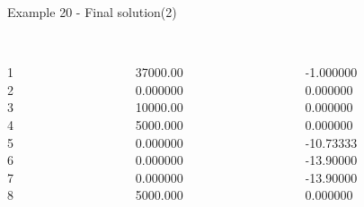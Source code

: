 \begin{frame}{Example 20 - Final solution(2)}
\footnotesize

\begin{columns}[t]
\begin{column}{0.3\textwidth}
\\
1\\
2\\
3\\
4\\
5\\
6\\
7\\
8\\
\end{column}

\begin{column}{0.3\textwidth}
\\
37000.00\\
0.000000\\
10000.00\\
5000.000\\
0.000000\\
0.000000\\
0.000000\\
5000.000\\
\end{column}  

\begin{column}{0.3\textwidth}
\\
-1.000000\\
0.000000\\
0.000000\\
0.000000\\
-10.73333\\
-13.90000\\
-13.90000\\
0.000000\\
\end{column}
\end{columns}
\end{frame}



